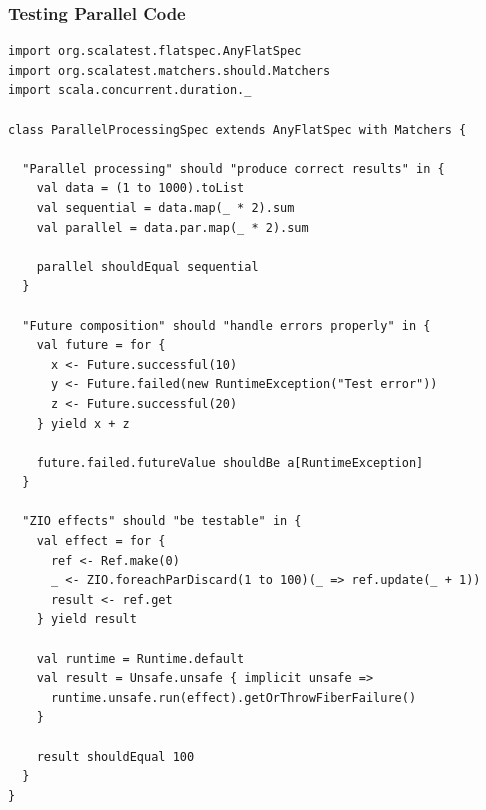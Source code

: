 \documentclass{beamer}
\begin{document}
\begin{frame}[fragile]
\frametitle{Testing Parallel Code}

\begin{lstlisting}[style=scalaStyle]
import org.scalatest.flatspec.AnyFlatSpec
import org.scalatest.matchers.should.Matchers
import scala.concurrent.duration._

class ParallelProcessingSpec extends AnyFlatSpec with Matchers {
  
  "Parallel processing" should "produce correct results" in {
    val data = (1 to 1000).toList
    val sequential = data.map(_ * 2).sum
    val parallel = data.par.map(_ * 2).sum
    
    parallel shouldEqual sequential
  }
  
  "Future composition" should "handle errors properly" in {
    val future = for {
      x <- Future.successful(10)
      y <- Future.failed(new RuntimeException("Test error"))
      z <- Future.successful(20)
    } yield x + z
    
    future.failed.futureValue shouldBe a[RuntimeException]
  }
  
  "ZIO effects" should "be testable" in {
    val effect = for {
      ref <- Ref.make(0)
      _ <- ZIO.foreachParDiscard(1 to 100)(_ => ref.update(_ + 1))
      result <- ref.get
    } yield result
    
    val runtime = Runtime.default
    val result = Unsafe.unsafe { implicit unsafe =>
      runtime.unsafe.run(effect).getOrThrowFiberFailure()
    }
    
    result shouldEqual 100
  }
}
\end{lstlisting}

\end{frame}
\end{document}
